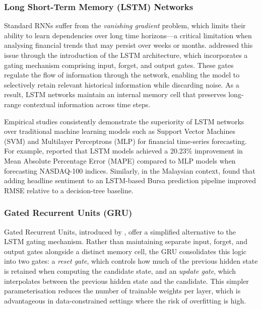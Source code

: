 \documentclass[12pt]{ucetd}
\begin{document}
\subsubsection{Long Short-Term Memory (LSTM) Networks}

Standard RNNs suffer from the \emph{vanishing gradient} problem, which limits their ability to learn dependencies over long time horizons---a critical limitation when analysing financial trends that may persist over weeks or months. \citet{hochreiter1997long} addressed this issue through the introduction of the LSTM architecture, which incorporates a gating mechanism comprising input, forget, and output gates. These gates regulate the flow of information through the network, enabling the model to selectively retain relevant historical information while discarding noise. As a result, LSTM networks maintain an internal memory cell that preserves long-range contextual information across time steps.

Empirical studies consistently demonstrate the superiority of LSTM networks over traditional machine learning models such as Support Vector Machines (SVM) and Multilayer Perceptrons (MLP) for financial time-series forecasting. For example, \citet{halder2024finbert} reported that LSTM models achieved a 20.23\% improvement in Mean Absolute Percentage Error (MAPE) compared to MLP models when forecasting NASDAQ-100 indices. Similarly, in the Malaysian context, \citet{sidek2023bursa} found that adding headline sentiment to an LSTM-based Bursa prediction pipeline improved RMSE relative to a decision-tree baseline.

\subsubsection{Gated Recurrent Units (GRU)}

Gated Recurrent Units, introduced by \citet{chung2014empirical}, offer a simplified alternative to the LSTM gating mechanism. Rather than maintaining separate input, forget, and output gates alongside a distinct memory cell, the GRU consolidates this logic into two gates: a \emph{reset gate}, which controls how much of the previous hidden state is retained when computing the candidate state, and an \emph{update gate}, which interpolates between the previous hidden state and the candidate. This simpler parameterisation reduces the number of trainable weights per layer, which is advantageous in data-constrained settings where the risk of overfitting is high.
\end{document}
